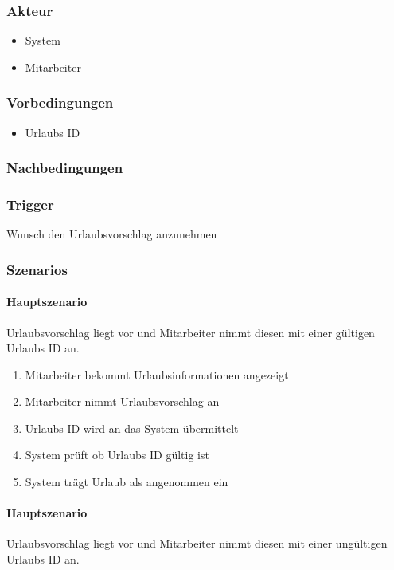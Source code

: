 \subsubsection{Akteur}
\begin{itemize}
	\item System
	\item Mitarbeiter
\end{itemize}

\subsubsection{Vorbedingungen}
\begin{itemize}
	\item Urlaubs ID
\end{itemize}

\subsubsection{Nachbedingungen}

\subsubsection{Trigger}
Wunsch den Urlaubsvorschlag anzunehmen

\subsubsection{Szenarios}
\paragraph{Hauptszenario}
Urlaubsvorschlag liegt vor und Mitarbeiter nimmt diesen mit einer gültigen Urlaubs ID an.

\begin{enumerate}
	\item Mitarbeiter bekommt Urlaubsinformationen angezeigt
	\item Mitarbeiter nimmt Urlaubsvorschlag an
	\item Urlaubs ID wird an das System übermittelt
	\item System prüft ob Urlaubs ID gültig ist
	\item System trägt Urlaub als angenommen ein
\end{enumerate}



\paragraph{Hauptszenario}
Urlaubsvorschlag liegt vor und Mitarbeiter nimmt diesen mit einer ungültigen Urlaubs ID an.

